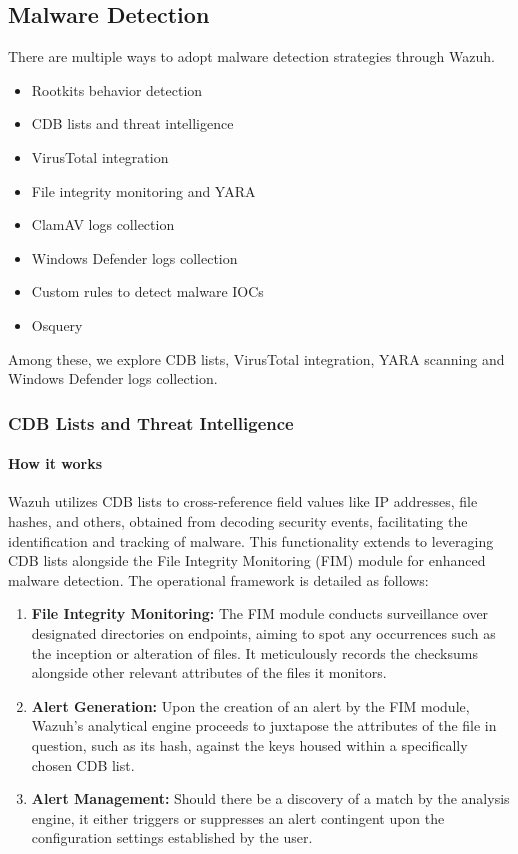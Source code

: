 \subsection{Malware Detection}
There are multiple ways to adopt malware detection strategies through Wazuh.
  \begin{itemize}
    \item Rootkits behavior detection
    \item CDB lists and threat intelligence
    \item VirusTotal integration
    \item File integrity monitoring and YARA
    \item ClamAV logs collection
    \item Windows Defender logs collection
    \item Custom rules to detect malware IOCs
    \item Osquery
  \end{itemize}

Among these, we explore CDB lists, VirusTotal integration, YARA scanning and Windows Defender logs collection.

\subsubsection{CDB Lists and Threat Intelligence}

\paragraph{How it works}
Wazuh utilizes CDB lists to cross-reference field values like IP addresses, file hashes, and others, obtained from decoding security events, facilitating the identification and tracking of malware. This functionality extends to leveraging CDB lists alongside the File Integrity Monitoring (FIM) module for enhanced malware detection. The operational framework is detailed as follows:

\begin{enumerate}
    \item \textbf{File Integrity Monitoring:} The FIM module conducts surveillance over designated directories on endpoints, aiming to spot any occurrences such as the inception or alteration of files. It meticulously records the checksums alongside other relevant attributes of the files it monitors.
    
    \item \textbf{Alert Generation:} Upon the creation of an alert by the FIM module, Wazuh's analytical engine proceeds to juxtapose the attributes of the file in question, such as its hash, against the keys housed within a specifically chosen CDB list.
    
    \item \textbf{Alert Management:} Should there be a discovery of a match by the analysis engine, it either triggers or suppresses an alert contingent upon the configuration settings established by the user.
\end{enumerate}

